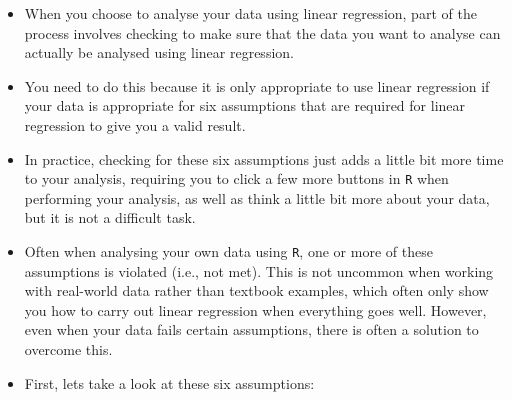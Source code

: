 \documentclass[]{report}
\begin{document}
\begin{itemize}
	\item When you choose to analyse your data using linear regression, part of the process involves checking to make sure that the data you want to analyse can actually be analysed using linear regression. 
	\item You need to do this because it is only appropriate to use linear regression if your data is appropriate for six assumptions that are required for linear regression to give you a valid result.
	
	\item In practice, checking for these six assumptions just adds a little bit more time to your analysis, requiring you to click a few more buttons in \texttt{R} when performing your analysis, as well as think a little bit more about your data, but it is not a difficult task.
	
	\item Often when analysing your own data using \texttt{R}, one or more of these assumptions is violated (i.e., not met). This is not uncommon when working with real-world data rather than textbook examples, which often only show you how to carry out linear regression when everything goes well. However, even when your data fails certain assumptions, there is often a solution to overcome this. 
	\item First, lets take a look at these six assumptions:
\end{itemize}
\end{document}

